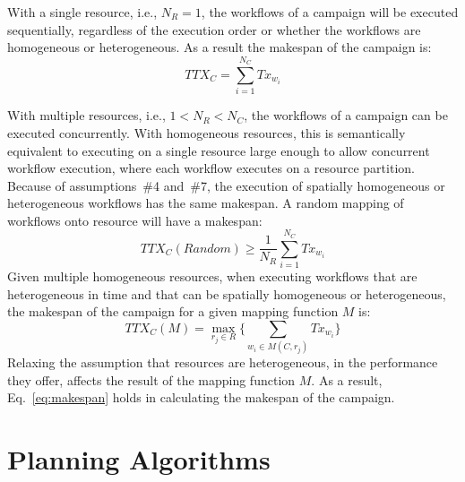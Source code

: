 With a single resource, i.e., $N_{R} = 1$, the workflows of a campaign will be 
executed sequentially, regardless of the execution order or whether the 
workflows are homogeneous or heterogeneous. As a result the makespan of the 
campaign is:
\begin{equation}
   TTX_{C} = \sum_{i=1}^{N_{C}}Tx_{w_{i}} 
\end{equation}

With multiple resources, i.e., $1 < N_{R} < N_{C}$, the workflows of a 
campaign can be executed concurrently. With homogeneous resources, this is 
semantically equivalent to executing on a single resource large enough to 
allow concurrent workflow execution, where each workflow executes on a 
resource partition. Because of assumptions~\#4 and~\#7, the execution of 
spatially homogeneous or heterogeneous workflows has the same makespan. A 
random mapping of workflows onto resource will have a makespan:
\begin{equation}
   TTX_{C}(Random) \geq \frac{1}{N_{R}}\sum_{i=1}^{N_{C}} Tx_{w_{i}} 
\end{equation}
Given multiple homogeneous resources, when executing workflows that are 
heterogeneous in time and that can be spatially homogeneous or heterogeneous, 
the makespan of the campaign for a given mapping function $ M $ is:
\begin{equation}
TTX_{C}(M) = \max_{r_{j}\in R}\Big\{\sum_{w_{i}\in M(C,r_{j})}Tx_{w_{i}}\Big\}
\label{eq:makespan}
\end{equation}
Relaxing the assumption that resources are heterogeneous, in the performance 
they offer, affects the result of the mapping function $ M $. As a result, 
Eq.~\ref{eq:makespan} holds in calculating the makespan of the campaign.


\section{Planning Algorithms}
\label{sec:algo}

